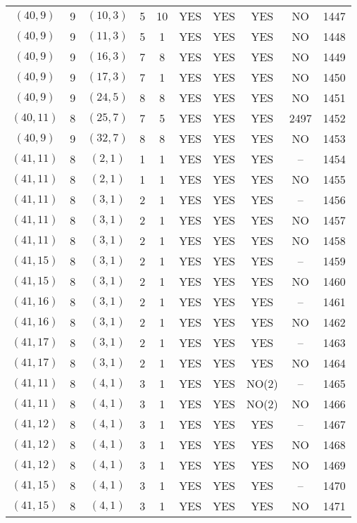 \begin{longtable}{|c|c|c|c|c|c|c|c|c|c|}
$(40, 9)$ & 9 & $(10, 3)$ & 5 & 10 & YES & YES & YES & NO & 1447\\
$(40, 9)$ & 9 & $(11, 3)$ & 5 & 1 & YES & YES & YES & NO & 1448\\
$(40, 9)$ & 9 & $(16, 3)$ & 7 & 8 & YES & YES & YES & NO & 1449\\
$(40, 9)$ & 9 & $(17, 3)$ & 7 & 1 & YES & YES & YES & NO & 1450\\
$(40, 9)$ & 9 & $(24, 5)$ & 8 & 8 & YES & YES & YES & NO & 1451\\
$(40, 11)$ & 8 & $(25, 7)$ & 7 & 5 & YES & YES & YES & 2497 & 1452\\
$(40, 9)$ & 9 & $(32, 7)$ & 8 & 8 & YES & YES & YES & NO & 1453\\
$(41, 11)$ & 8 & $(2, 1)$ & 1 & 1 & YES & YES & YES & -- & 1454\\
$(41, 11)$ & 8 & $(2, 1)$ & 1 & 1 & YES & YES & YES & NO & 1455\\
$(41, 11)$ & 8 & $(3, 1)$ & 2 & 1 & YES & YES & YES & -- & 1456\\
$(41, 11)$ & 8 & $(3, 1)$ & 2 & 1 & YES & YES & YES & NO & 1457\\
$(41, 11)$ & 8 & $(3, 1)$ & 2 & 1 & YES & YES & YES & NO & 1458\\
$(41, 15)$ & 8 & $(3, 1)$ & 2 & 1 & YES & YES & YES & -- & 1459\\
$(41, 15)$ & 8 & $(3, 1)$ & 2 & 1 & YES & YES & YES & NO & 1460\\
$(41, 16)$ & 8 & $(3, 1)$ & 2 & 1 & YES & YES & YES & -- & 1461\\
$(41, 16)$ & 8 & $(3, 1)$ & 2 & 1 & YES & YES & YES & NO & 1462\\
$(41, 17)$ & 8 & $(3, 1)$ & 2 & 1 & YES & YES & YES & -- & 1463\\
$(41, 17)$ & 8 & $(3, 1)$ & 2 & 1 & YES & YES & YES & NO & 1464\\
$(41, 11)$ & 8 & $(4, 1)$ & 3 & 1 & YES & YES & NO(2) & -- & 1465\\
$(41, 11)$ & 8 & $(4, 1)$ & 3 & 1 & YES & YES & NO(2) & NO & 1466\\
$(41, 12)$ & 8 & $(4, 1)$ & 3 & 1 & YES & YES & YES & -- & 1467\\
$(41, 12)$ & 8 & $(4, 1)$ & 3 & 1 & YES & YES & YES & NO & 1468\\
$(41, 12)$ & 8 & $(4, 1)$ & 3 & 1 & YES & YES & YES & NO & 1469\\
$(41, 15)$ & 8 & $(4, 1)$ & 3 & 1 & YES & YES & YES & -- & 1470\\
$(41, 15)$ & 8 & $(4, 1)$ & 3 & 1 & YES & YES & YES & NO & 1471\\

\end{longtable}
